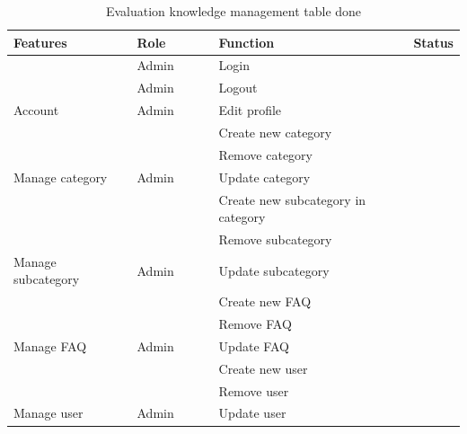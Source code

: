 \documentclass[12pt,oneside,openright,a4paper]{cpe-english-project}
\begin{document}
	\begin{table}[h]
		\caption{Evaluation knowledge management table done}
		\label{tab:Evaluation knowledge management table done}
	\begin{adjustbox}{width=\textwidth}
	\begin{tabular}{|p{0.3\linewidth}|p{0.2\linewidth}|p{0.5\linewidth}|p{0.1\linewidth}|}
	\hline
	\rowcolor[HTML]{C9DAF8} 
	Features                             & Role                    & Function                           & Status \\ \hline
										 & Admin                   & Login                              &        \\ \cline{2-4} 
										 & Admin                   & Logout                             &        \\ \cline{2-4} 
	\multirow{-3}{*}{Account}            & Admin                   & Edit profile                       &        \\ \hline
										 &                         & Create new category                &        \\ \cline{3-4} 
										 &                         & Remove category                    &        \\ \cline{3-4} 
	\multirow{-3}{*}{Manage category}    & \multirow{-3}{*}{Admin} & Update category                    &        \\ \hline
										 &                         & Create new subcategory in category &        \\ \cline{3-4} 
										 &                         & Remove subcategory                 &        \\ \cline{3-4} 
	\multirow{-3}{*}{Manage subcategory} & \multirow{-3}{*}{Admin} & Update subcategory                 &        \\ \hline
										 &                         & Create new FAQ                     &        \\ \cline{3-4} 
										 &                         & Remove FAQ                         &        \\ \cline{3-4} 
	\multirow{-3}{*}{Manage FAQ}         & \multirow{-3}{*}{Admin} & Update FAQ                         &        \\ \hline
										 &                         & Create new user                    &        \\ \cline{3-4} 
										 &                         & Remove user                        &        \\ \cline{3-4} 
	\multirow{-3}{*}{Manage   user}      & \multirow{-3}{*}{Admin} & Update user                        &        \\ \hline
	\end{tabular}
	\end{adjustbox}
	\end{table}
\end{document}

